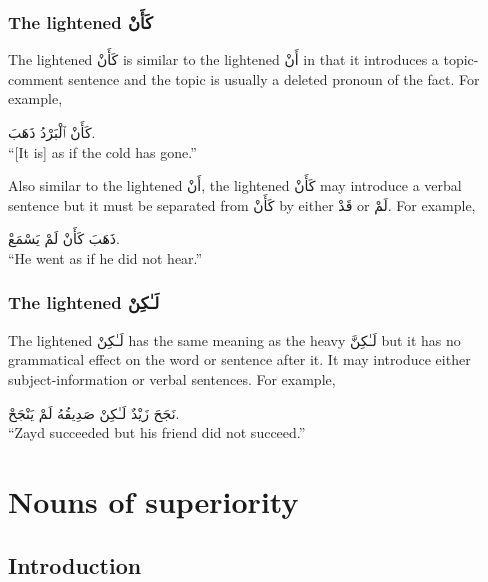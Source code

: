 \documentclass[
  10pt,
]{book}
\begin{document}
\subsection{\texorpdfstring{The lightened \foreignlanguage{arabic}{کَأَنْ}}{The lightened کَأَنْ}}\label{the-lightened-ux643ux623ux646}

The lightened \foreignlanguage{arabic}{کَأَنْ} is similar to the lightened \foreignlanguage{arabic}{أَنْ} in that it introduces a topic-comment sentence and the topic is usually a deleted pronoun of the fact. For example,

\foreignlanguage{arabic}{کَأَنْ ٱلْبَرْدُ ذَهَبَ.}\\
\enquote{{[}It is{]} as if the cold has gone.}

Also similar to the lightened \foreignlanguage{arabic}{أَنْ}, the lightened \foreignlanguage{arabic}{کَأَنْ} may introduce a verbal sentence but it must be separated from \foreignlanguage{arabic}{کَأَنْ} by either \foreignlanguage{arabic}{قَدْ} or \foreignlanguage{arabic}{لَمْ}. For example,

\foreignlanguage{arabic}{ذَهَبَ کَأَنْ لَمْ يَسْمَعْ.}\\
\enquote{He went as if he did not hear.}

\subsection{\texorpdfstring{The lightened \foreignlanguage{arabic}{لَـٰکِنْ}}{The lightened لَـٰکِنْ}}\label{the-lightened-ux644ux640ux643ux646}

The lightened \foreignlanguage{arabic}{لَـٰکِنْ} has the same meaning as the heavy \foreignlanguage{arabic}{لَـٰکِنَّ} but it has no grammatical effect on the word or sentence after it. It may introduce either subject-information or verbal sentences. For example,

\foreignlanguage{arabic}{نَجَحَ زَيْدٌ لَـٰکِنْ صَدِيقُهُ لَمْ يَنْجَحْ.}\\
\enquote{Zayd succeeded but his friend did not succeed.}

\chapter{Nouns of superiority}\label{nouns-of-superiority}

\section{Introduction}\label{introduction-22}
\end{document}
